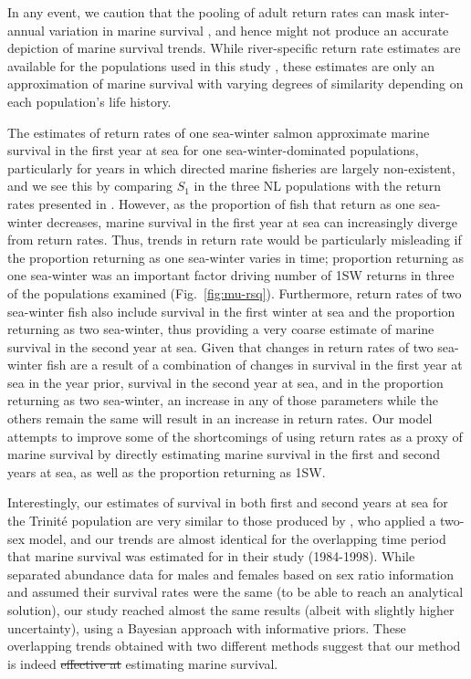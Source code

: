 \documentclass[12pt]{article}
\providecommand{\DIFaddtex}[1]{{\protect\color{blue}\uwave{#1}}} %
\providecommand{\DIFdeltex}[1]{{\protect\color{red}\sout{#1}}}                      %
\providecommand{\DIFaddbegin}{} %
\providecommand{\DIFaddend}{} %
\providecommand{\DIFdelbegin}{} %
\providecommand{\DIFdelend}{} %
\providecommand{\DIFadd}[1]{\texorpdfstring{\DIFaddtex{#1}}{#1}} %
\providecommand{\DIFdel}[1]{\texorpdfstring{\DIFdeltex{#1}}{}} %
\begin{document}
In any event, we caution that the pooling of adult return rates
\citep{Chaput2012a, Friedland1993,Gibson2016} can mask inter-annual
variation in marine survival \citep{Hubley2011}, and hence might not produce
an accurate depiction of marine survival trends.
While river-specific return rate estimates are available for the populations
used in this study \citep{ICES2019}, these estimates are only an approximation
of marine survival with varying degrees of similarity depending on each
population's life history.

The estimates of return rates of one sea-winter salmon
approximate marine survival in the first year at sea for one
sea-winter-dominated populations, particularly for years in which
directed marine fisheries are largely non-existent,
and we see this by comparing $S_1$ in the three NL populations
with the return rates presented in \citet{ICES2019}. However, as the proportion of fish that
return as one sea-winter decreases, marine survival in the first year at sea
can increasingly diverge from return rates. Thus, trends in return rate
would be particularly misleading if the proportion returning as one sea-winter
varies in time;
proportion returning as one sea-winter was an important factor driving number of
1SW returns in three of the populations examined (Fig.~\ref{fig:mu-rsq}).
Furthermore, return rates of two sea-winter fish also include survival in the
first winter at sea and the proportion returning as two sea-winter, thus
providing a very coarse estimate of marine survival in the second year at sea.
Given that changes in return rates of two sea-winter fish are a result of a
combination of changes in survival in the first year at sea in the year prior,
survival in the second year at sea, and in the proportion returning as two
sea-winter, an increase in any of those parameters while the others remain
the same will result in an increase in return rates. Our model attempts to
improve some of the shortcomings of using return rates as a proxy of marine
survival by directly estimating marine survival in the first and second years
at sea, as well as the proportion returning as 1SW.

Interestingly, our estimates of survival in both first and second years at sea
for the Trinit\'{e} population are very similar to those produced by
\citet{Chaput2003b}, who applied a two-sex model, and our trends are almost identical
for the overlapping time period that marine survival was estimated for in
their study (1984-1998). While \citet{Chaput2003b} separated abundance data
for males and females based on sex ratio information and assumed their
survival rates were the same (to be able to reach an analytical solution), our
study reached almost the same results (albeit with slightly higher
uncertainty), using a Bayesian approach with informative priors. These overlapping
trends obtained with two different methods suggest that our method is indeed
\DIFdelbegin \DIFdel{effective at }\DIFdelend \DIFaddbegin \DIFadd{a viable alternative approach for }\DIFaddend estimating marine survival.
\end{document}
